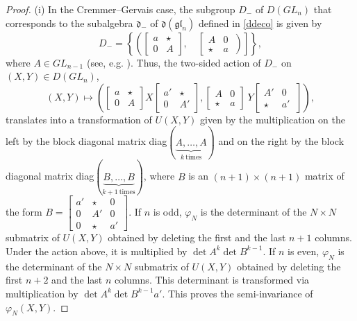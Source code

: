 \documentclass{amsart}
\theoremstyle{definition}
\theoremstyle{remark}
\numberwithin{equation}{section}
\numberwithin{theorem}{section}
\begin{document}
\begin{proof} (i) In the Cremmer--Gervais case, the subgroup $D_-$ of $D(GL_n)$ that corresponds to the subalgebra ${{\mathfrak d}}_-$ of ${{\mathfrak d}}({\mathfrak g\mathfrak l}_n)$ defined in \eqref{ddeco} is
given by
$$
D_-=\left \{\left (  
\left [
\begin{array}{cc} a & \star\\ 0 & A\end{array}
\right ], \quad
\left [
\begin{array}{cc} A & 0\\ \star & a\end{array}\ 
\right ) 
\right ]\right \},
$$
where $A\in GL_{n-1}$ (see, e.g. \cite{Y}).
Thus, the two-sided action of $D_-$ on $( X, Y)\in D(GL_n)$,
$$
(X, Y) \mapsto \left ( \left [
\begin{array}{cc} a & \star\\ 0 & A\end{array}
\right ] X \left [
\begin{array}{cc} a' & \star\\ 0 & A'\end{array}
\right ], \left [
\begin{array}{cc} A & 0\\ \star & a\end{array}\right ] \ Y \left [
\begin{array}{cc} A' & 0\\ \star & a'\end{array}\ 
\right ]
\right ),
$$
translates into a transformation of $U(X,Y)$ given by the multiplication on the left by the block diagonal
matrix diag$(\underbrace{A,\ldots, A}_{k \ \mbox{times}})$ and on the right by the block diagonal
matrix diag$(\underbrace{B,\ldots, B}_{k+1 \ \mbox{times}})$, where $B$ is an $(n+1)\times (n+1)$ matrix of the form
$ B=\left [
\begin{array}{ccc} a' & \star& 0 \\ 0 & A' & 0\\ 0 & \star & a'\end{array}
\right ] $. If $n$ is odd, ${{\varphi}}_N$ is the determinant of the $N\times N$ submatrix of $U(X,Y)$ obtained by 
deleting the first and the last $n+1$ columns. Under the action above, it is multiplied by 
$\det A^{k} \det B^{k-1}$.  If $n$ is even,  ${{\varphi}}_N$ is the determinant of the $N\times N$ submatrix of 
$U(X,Y)$ obtained by deleting the first $n+2$ and the last $n$ columns. 
This determinant is transformed via multiplication 
by $\det A^{k} \det B^{k-1}a'$.
This proves the semi-invariance of ${{\varphi}}_N(X,Y)$.


\end{proof}
\end{document}
